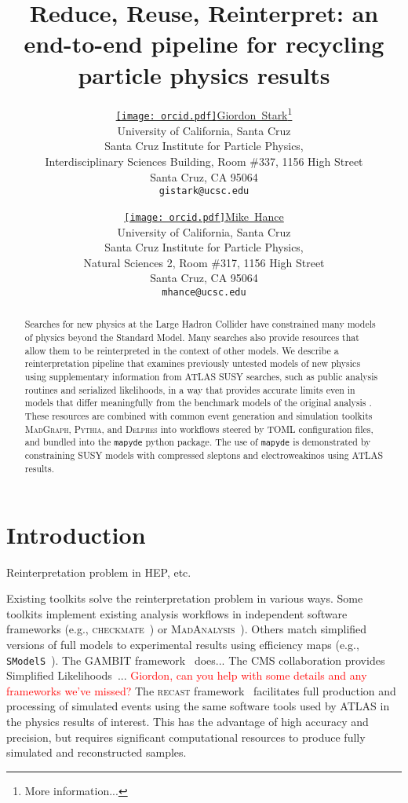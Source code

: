 \documentclass{article}
\title{Reduce, Reuse, Reinterpret: an end-to-end pipeline for recycling particle physics results}
\author{ \href{https://orcid.org/0000-0001-6616-3433}{\texttt{[image: orcid.pdf]}\hspace{1mm}Giordon~Stark}\thanks{More information...} \\
  University of California, Santa Cruz \\
  Santa Cruz Institute for Particle Physics, \\
  Interdisciplinary Sciences Building, Room \#337, 1156 High Street \\
  Santa Cruz, CA 95064 \\
	\texttt{gistark@ucsc.edu} \\
	\and
	\href{https://orcid.org/0000-0001-8392-0934}{\texttt{[image: orcid.pdf]}\hspace{1mm}Mike~Hance} \\
  University of California, Santa Cruz \\
  Santa Cruz Institute for Particle Physics, \\
  Natural Sciences 2, Room \#317, 1156 High Street \\
  Santa Cruz, CA 95064 \\
	\texttt{mhance@ucsc.edu} \\
}
\newcommand{\mapyde}{\texttt{mapyde}}
\newcommand{\madgraph}{\textsc{MadGraph}}
\newcommand{\pythia}{\textsc{Pythia}}
\newcommand{\delphes}{\textsc{Delphes}}
\begin{document}
\maketitle

\begin{abstract}
Searches for new physics at the Large Hadron Collider have constrained many models of physics beyond the Standard Model.  Many searches also provide resources that allow them to be reinterpreted in the context of other models.  We describe a reinterpretation pipeline that examines previously untested models of new physics using supplementary information from ATLAS SUSY searches, such as public analysis routines and serialized likelihoods, in a way that provides accurate limits even in models that differ meaningfully from the benchmark models of the original analysis .  These resources are combined with common event generation and simulation toolkits \madgraph, \pythia, and \delphes{} into workflows steered by \textsc{TOML} configuration files, and bundled into the \mapyde{} python package.  The use of \mapyde{} is demonstrated by constraining SUSY models with compressed sleptons and electroweakinos using ATLAS results.
\end{abstract}




\section{Introduction}
\label{sec:introduction}

Reinterpretation problem in HEP, etc.

Existing toolkits solve the reinterpretation problem in various ways.  Some toolkits implement existing analysis workflows in independent software frameworks (e.g., \textsc{checkmate}~\cite{Dercks:2016npn}) or \textsc{MadAnalysis}~\cite{Araz:2020lnp}).  Others match simplified versions of full models to experimental results using efficiency maps (e.g., \texttt{SModelS}~\cite{Alguero:2021dig}).  The GAMBIT framework~\cite{GAMBIT:2017yxo} does...  The CMS collaboration provides Simplified Likelihoods~\cite{Collaboration:2242860}...  \textcolor{red}{Giordon, can you help with some details and any frameworks we've missed?}  The \textsc{recast} framework~\cite{Cranmer:2010hk} facilitates full production and processing of simulated events using the same software tools used by ATLAS in the physics results of interest.  This has the advantage of high accuracy and precision, but requires significant computational resources to produce fully simulated and reconstructed samples.
\end{document}
